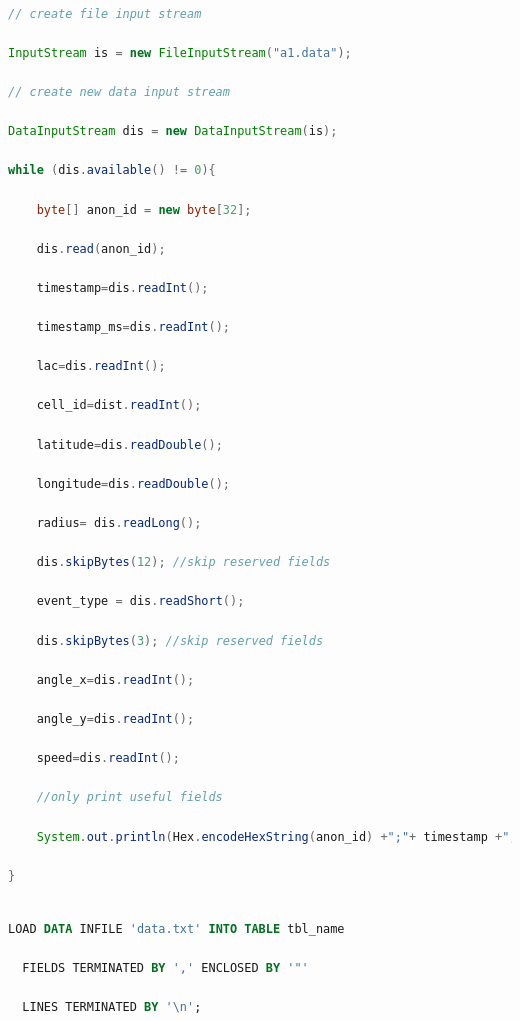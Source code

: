 \documentclass[master,english]{hgbthesis}
\begin{document}
\begin{lstlisting}[language=Java,style=JAVA,caption={Example code to parse event data stream},label={lst:parsestream}]

// create file input stream

InputStream is = new FileInputStream("a1.data");

// create new data input stream

DataInputStream dis = new DataInputStream(is);

while (dis.available() != 0){

    byte[] anon_id = new byte[32];

    dis.read(anon_id);

    timestamp=dis.readInt();

    timestamp_ms=dis.readInt();

    lac=dis.readInt();

    cell_id=dist.readInt();

    latitude=dis.readDouble();

    longitude=dis.readDouble();

    radius= dis.readLong();

    dis.skipBytes(12); //skip reserved fields

    event_type = dis.readShort();

    dis.skipBytes(3); //skip reserved fields

    angle_x=dis.readInt();

    angle_y=dis.readInt();

    speed=dis.readInt();

    //only print useful fields

    System.out.println(Hex.encodeHexString(anon_id) +";"+ timestamp +";"+lac +";"+cell_id +";"+latitude +";"+longitude +";"+event_type +";"+angle_x);

}

\end{lstlisting}

\begin{lstlisting}[style=htmlcssjs,language=SQL,caption={Load text file into MySQL database},label={lst:textmysql}]

LOAD DATA INFILE 'data.txt' INTO TABLE tbl_name

  FIELDS TERMINATED BY ',' ENCLOSED BY '"'

  LINES TERMINATED BY '\n';

\end{lstlisting}
\end{document}
